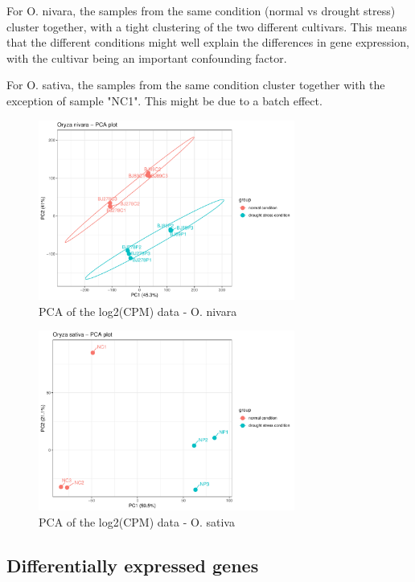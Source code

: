 For O. nivara, the samples from the same condition (normal vs drought stress) cluster together, with a tight clustering of the two different cultivars. This means that the different conditions might well explain the differences in gene expression, with the cultivar being an important confounding factor.

For O. sativa, the samples from the same condition cluster together with the exception of sample "NC1". This might be due to a batch effect.

\begin{figure}[htbp]
    \caption{PCA of the log2(CPM) data - O. nivara}
    \label{fig:3.2-PCA-Oryza_nivara}
    \includegraphics[width=0.75\textwidth]{../../results/plots-and-tables/3.2-PCA-Oryza_nivara}
\end{figure}

\begin{figure}[htbp]
    \caption{PCA of the log2(CPM) data - O. sativa}
    \label{fig:3.2-PCA-Oryza_sativa}
    \includegraphics[width=0.75\textwidth]{../../results/plots-and-tables/3.2-PCA-Oryza_sativa}
\end{figure}


\subsection{Differentially expressed genes}



